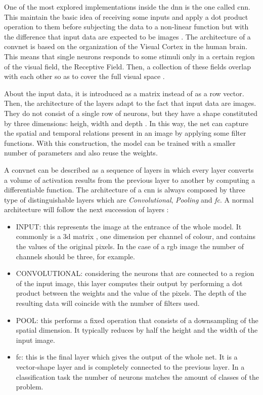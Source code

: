 
	One of the most explored implementations inside the \acrshort{dnn} is the one called \acrfull{cnn}. This maintain the basic idea of receiving some inputs and apply a dot product operation to them before subjecting the data to a non-linear function but with the difference that input data are expected to be images \cite{Karpathy2016}. The architecture of a \acrlong{convnet} is based on the organization of the Visual Cortex in the human brain. This means that single neurons responds to some stimuli only in a certain region of the visual field, the Receptive Field. Then, a collection of these fields overlap with each other so as to cover the full visual space \cite{Saha2018}.
	
	About the input data, it is introduced as a matrix instead of as a row vector. Then, the architecture of the layers adapt to the fact that input data are images. They do not consist of a single row of neurons, but they have a shape constituted by three dimensions: heigh, width and depth \cite{Karpathy2016} . In this way, the net can capture the spatial and temporal relations present in an image by applying some filter functions. With this construction, the model can be trained with a smaller number of parameters and also reuse the weights.
	
	A \acrlong{convnet} can be described as a sequence of layers in which every layer converts a volume of activation results from the previous layer to another by computing a differentiable function. The architecture of a \acrshort{cnn} is always composed by three type of distinguishable layers which are \textit{Convolutional}, \textit{Pooling} and \textit{\acrlong{fc}}. A normal architecture will follow the next succession of layers \cite{Karpathy2016}:
	
	\begin{itemize}
		\item INPUT: this represents the image at the entrance of the whole model. It commonly is a 3\acrshort{d} matrix , one dimension per channel of colour, and contains the values of the original pixels. In the case of a \acrshort{rgb} image the number of channels should be three, for example.
		\item CONVOLUTIONAL: considering the neurons that are connected to a region of the input image, this layer computes their output by performing a dot product between the weights and the value of the pixels. The depth of the resulting data will coincide with the number of filters used.
		\item POOL: this performs a fixed operation that consists of a downsampling of the spatial dimension. It typically reduces by half the height and the width of the input image.
		\item \acrshort{fc}: this is the final layer which gives the output of the whole net. It is a vector-shape layer and is completely connected to the previous layer. In a classification task the number of neurons matches the amount of classes of the problem.
	\end{itemize}
	
